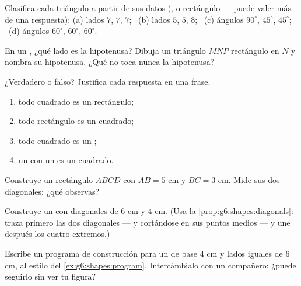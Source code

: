 \begin{exercise}[$\star$]\label{exo:g6:shapes:4}
Clasifica cada triángulo a partir de sus datos (,  o
rectángulo --- puede valer más de una respuesta):
(a) lados $7$, $7$, $7$; \
(b) lados $5$, $5$, $8$; \
(c) ángulos $90^\circ$, $45^\circ$, $45^\circ$; \
(d) ángulos $60^\circ$, $60^\circ$, $60^\circ$.
\end{exercise}

\begin{exercise}[$\star$]\label{exo:g6:shapes:5}
En un , ¿qué lado es la hipotenusa? Dibuja un triángulo
$MNP$ rectángulo en $N$ y nombra su hipotenusa. ¿Qué  no
toca nunca la hipotenusa?
\end{exercise}

\begin{exercise}[$\star$]\label{exo:g6:shapes:6}
¿Verdadero o falso? Justifica cada respuesta en una frase.
\begin{enumerate}
  \item todo cuadrado es un rectángulo;
  \item todo rectángulo es un cuadrado;
  \item todo cuadrado es un ;
  \item un  con un  es un cuadrado.
\end{enumerate}
\end{exercise}

\begin{exercise}[$\star$]\label{exo:g6:shapes:7}
Construye un rectángulo $ABCD$ con $AB = 5$ cm y $BC = 3$ cm. Mide
sus dos diagonales: ¿qué observas?
\end{exercise}

\begin{exercise}[$\star$]\label{exo:g6:shapes:8}
Construye un  con diagonales de $6$ cm y $4$ cm. (Usa la
\cref{prop:g6:shapes:diagonals}: traza primero las dos diagonales ---
\omterm{def:g6:lines:perp}{perpendiculares} y cortándose en sus puntos medios --- y une después los cuatro
extremos.)
\end{exercise}

\begin{exercise}[$\star\star$]\label{exo:g6:shapes:9}
Escribe un programa de construcción para un  de base
$4$ cm y lados iguales de $6$ cm, al estilo del
\cref{ex:g6:shapes:program}. Intercámbialo con un compañero: ¿puede seguirlo
sin ver tu figura?
\end{exercise}

